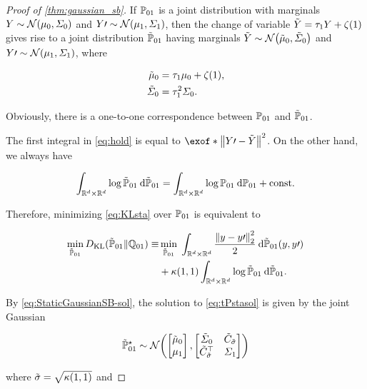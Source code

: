 \begin{proof}[Proof of \cref{thm:gaussian_sb}]
If $\mathbb{P}_{{01}}$ is a joint distribution with marginals $Y \sim \Ncal\parens*{ \m, \covar}$ and $Y\prime\sim\Ncal\parens*{ \malt, \covaralt}$, then the change of variable $\tilde{Y} = \aggtime[\horizon]Y + \tshift[\horizon]$ gives rise to a joint distribution $\tilde{\mathbb{P}}_{\mathrm{01}}$ having marginals $\tilde{Y} \sim \Ncal\parens*{ \tm, \tcovar}$ and $Y\prime\sim\Ncal\parens*{ \malt, \covaralt}$, where

\begin{align}
\tm &= \aggtime[\horizon]\m + \tshift[\horizon], \\
\tcovar &= \aggtimesq[\horizon] \covar.
\end{align}

Obviously, there is a one-to-one correspondence between $\mathbb{P}_{{01}}$ and $\tilde{\mathbb{P}}_{\mathrm{01}}$.

The first integral in \eqref{eq:hold} is equal to $ \exof*{  \norm*{  Y\prime- \tilde{Y} }^2 }$. On the other hand, we always have 

\begin{equation}
\nonumber
\int_{\mathbb{R}^{d} \times \mathbb{R}^{d} } \log  \tilde{\mathbb{P}}_{\mathrm{01}}  \:\mathrm{d} \tilde{\mathbb{P}}_{\mathrm{01}} =\int_{\mathbb{R}^{d} \times \mathbb{R}^{d} } \log  \mathbb{P}_{{01}}  \:\mathrm{d} \mathbb{P}_{{01}} +\mathrm{const.}
\end{equation}


Therefore, minimizing \eqref{eq:KLsta} over $\mathbb{P}_{{01}}$ is equivalent to

\begin{align}
\label{eq:tPstasol}
\min_{ \tPsta} \KL( \tPsta \| \Qsta)\equiv &\min_{ \tPsta}\; \intRR  \frac{ \norm*{ y - y\prime}_2^2}{2} \dd \tPsta(y, y\prime) \\
&+  \kernel[\horizon][\horizon]\intRR \log  \tPsta  \dd \tPsta.
\end{align}

By \eqref{eq:StaticGaussianSB-sol}, the solution to \eqref{eq:tPstasol} is given by the joint Gaussian 

\begin{align}
\tPstasol \sim \Ncal \parens*{  \begin{bmatrix}
\tm \\
\malt
\end{bmatrix},  \begin{bmatrix}
\tcovar & \tilde{C}_{\tilde{\sdev}    } \\
\tilde{C}_{ \tilde{\sdev}}^\top & \covaralt
\end{bmatrix}}
\end{align}

where $\tilde{\sdev} = \sqrt{ \kernel[\horizon][\horizon]}$ and


\end{proof}
